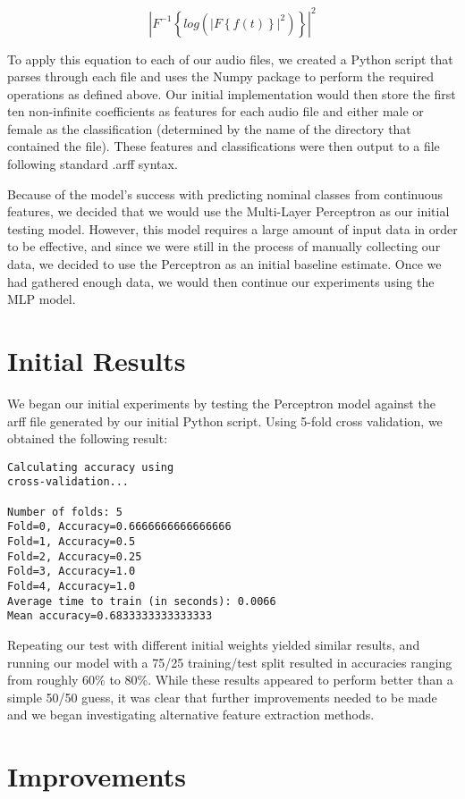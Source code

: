 \documentclass{article}
\begin{document}
$$
\left |{F}^{-1}\left \{log(\left |F\left \{f(t)\right \}\right |^2)\right \}  \right |^2 
$$

To apply this equation to each of our audio files, we created a Python script that parses through each file and uses the Numpy package to perform the required operations as defined above.  Our initial implementation would then store the first ten non-infinite coefficients as features for each audio file and either male or female as the classification (determined by the name of the directory that contained the file).  These features and classifications were then output to a file following standard .arff syntax.

Because of the model’s success with predicting nominal classes from continuous features, we decided that we would use the Multi-Layer Perceptron as our initial testing model.  However, this model requires a large amount of input data in order to be effective, and since we were still in the process of manually collecting our data, we decided to use the Perceptron as an initial baseline estimate.  Once we had gathered enough data, we would then continue our experiments using the MLP model.

\section{Initial Results}

We began our initial experiments by testing the Perceptron model against the arff file generated by our initial Python script. Using 5-fold cross validation, we obtained the following result:

\begin{verbatim}
Calculating accuracy using
cross-validation...

Number of folds: 5
Fold=0, Accuracy=0.6666666666666666
Fold=1, Accuracy=0.5
Fold=2, Accuracy=0.25
Fold=3, Accuracy=1.0
Fold=4, Accuracy=1.0
Average time to train (in seconds): 0.0066
Mean accuracy=0.6833333333333333
\end{verbatim}

Repeating our test with different initial weights yielded similar results, and running our model with a 75/25 training/test split resulted in accuracies ranging from roughly 60\% to 80\%.  While these results appeared to perform better than a simple 50/50 guess, it was clear that further improvements needed to be made and we began investigating alternative feature extraction methods.

\section{Improvements}
\end{document}
